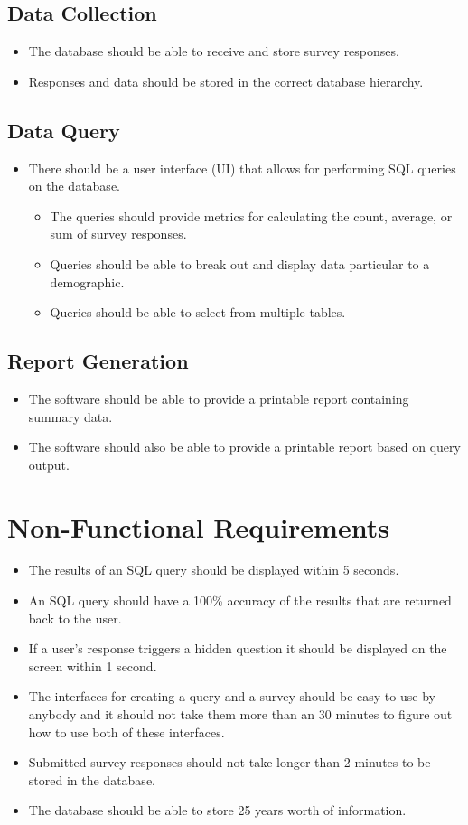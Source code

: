 \documentclass[letterpaper,10pt,titlepag,e draftclsnofoot,onecolumn]{IEEEtran}
\begin{document}
\subsection{Data Collection}
\begin{itemize}
\item The database should be able to receive and store survey responses.
\item Responses and data should be stored in the correct database hierarchy.
\end{itemize}

\subsection{Data Query}
\begin{itemize}
\item There should be a user interface (UI) that allows for performing SQL queries on the database.
	\begin{itemize}
	\item The queries should provide metrics for calculating the count, average, or sum of survey responses.
	\item Queries should be able to break out and display data particular to a demographic.
	\item Queries should be able to select from multiple tables.
	\end{itemize}
\end{itemize}

\subsection{Report Generation}
\begin{itemize}
\item The software should be able to provide a printable report containing summary data.
\item The software should also be able to provide a printable report based on query output.
\end{itemize}

\section{Non-Functional Requirements}
\begin{itemize}
\item The results of an SQL query should be displayed within 5 seconds. 
\item An SQL query should have a 100\% accuracy of the results that are returned back to the user. 
\item If a user's response triggers a hidden question it should be displayed on the screen within 1 second.
\item The interfaces for creating a query and a survey should be easy to use by anybody and it should not take them more than an 30 minutes to figure out how to use both of these interfaces. 
\item Submitted survey responses should not take longer than 2 minutes to be stored in the database. 
\item The database should be able to store 25 years worth of information. 
\end{itemize}
\end{document}
